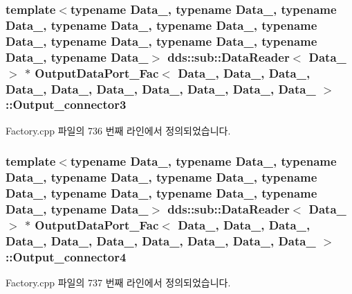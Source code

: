 \subsubsection[{\texorpdfstring{Output\+\_\+connector3}{Output_connector3}}]{\setlength{\rightskip}{0pt plus 5cm}template$<$typename Data\+\_, typename Data\+\_, typename Data\+\_, typename Data\+\_, typename Data\+\_, typename Data\+\_, typename Data\+\_, typename Data\+\_, typename Data\+\_, typename Data\+\_$>$ dds\+::sub\+::\+Data\+Reader$<$ Data\+\_ $>$ $\ast$ {\bf Output\+Data\+Port\+\_\+\+Fac}$<$ Data\+\_, Data\+\_, Data\+\_, Data\+\_, Data\+\_, Data\+\_, Data\+\_, Data\+\_, Data\+\_, Data\+\_ $>$\+::Output\+\_\+connector3}\hypertarget{classOutputDataPort__Fac_a1af0578ddf88e8e55fdcd0d60ff5cbdf}{}\label{classOutputDataPort__Fac_a1af0578ddf88e8e55fdcd0d60ff5cbdf}


Factory.\+cpp 파일의 736 번째 라인에서 정의되었습니다.

\subsubsection[{\texorpdfstring{Output\+\_\+connector4}{Output_connector4}}]{\setlength{\rightskip}{0pt plus 5cm}template$<$typename Data\+\_, typename Data\+\_, typename Data\+\_, typename Data\+\_, typename Data\+\_, typename Data\+\_, typename Data\+\_, typename Data\+\_, typename Data\+\_, typename Data\+\_$>$ dds\+::sub\+::\+Data\+Reader$<$ Data\+\_ $>$ $\ast$ {\bf Output\+Data\+Port\+\_\+\+Fac}$<$ Data\+\_, Data\+\_, Data\+\_, Data\+\_, Data\+\_, Data\+\_, Data\+\_, Data\+\_, Data\+\_, Data\+\_ $>$\+::Output\+\_\+connector4}\hypertarget{classOutputDataPort__Fac_a2aa8ee8913f4c2964d3b69eaa03f406e}{}\label{classOutputDataPort__Fac_a2aa8ee8913f4c2964d3b69eaa03f406e}


Factory.\+cpp 파일의 737 번째 라인에서 정의되었습니다.

